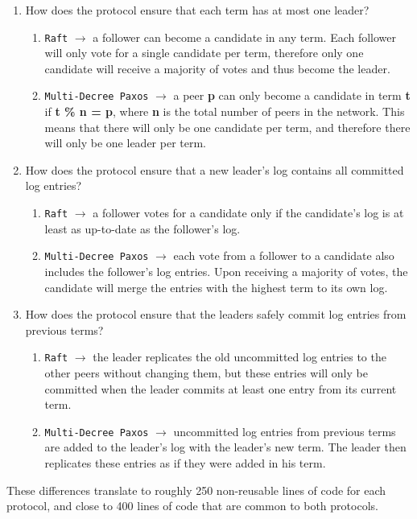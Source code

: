 \begin{enumerate}
  \item How does the protocol ensure that each term has at most one leader?
  \begin{enumerate}
    \item \texttt{Raft} $\xrightarrow{}$ a follower can become a candidate in any term. Each follower will only vote for a single candidate per term, therefore only one candidate will receive a majority of votes and thus become the leader.
    \item \texttt{Multi-Decree Paxos} $\xrightarrow{}$ a peer \textbf{p} can only become a candidate in term \textbf{t} if \textbf{t \% n = p}, where \textbf{n} is the total number of peers in the network. This means that there will only be one candidate per term, and therefore there will only be one leader per term.
  \end{enumerate}
  \item How does the protocol ensure that a new leader's log contains all committed log entries?
  \begin{enumerate}
    \item \texttt{Raft} $\xrightarrow{}$ a follower votes for a candidate only if the candidate's log is at least as up-to-date as the follower's log.
    \item \texttt{Multi-Decree Paxos} $\xrightarrow{}$ each vote from a follower to a candidate also includes the follower's log entries. Upon receiving a majority of votes, the candidate will merge the entries with the highest term to its own log.
  \end{enumerate}
  \item How does the protocol ensure that the leaders safely commit log entries from previous terms?
  \begin{enumerate}
    \item \texttt{Raft} $\xrightarrow{}$ the leader replicates the old uncommitted log entries to the other peers without changing them, but these entries will only be committed when the leader commits at least one entry from its current term.
    \item \texttt{Multi-Decree Paxos} $\xrightarrow{}$ uncommitted log entries from previous terms are added to the leader's log with the leader's new term. The leader then replicates these entries as if they were added in his term.
  \end{enumerate}
\end{enumerate}

These differences translate to roughly 250 non-reusable lines of code for each protocol, and close to 400 lines of code that are common to both protocols.

